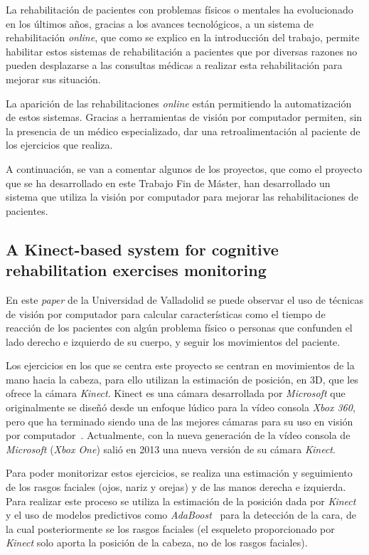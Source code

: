 
La rehabilitación de pacientes con problemas físicos o mentales ha evolucionado en los últimos años, gracias a los avances tecnológicos, a un sistema de rehabilitación \textit{online}, que como se explico en la introducción del trabajo, permite habilitar estos sistemas de rehabilitación a pacientes que por diversas razones no pueden desplazarse a las consultas médicas a realizar esta rehabilitación para mejorar sus situación.

La aparición de las rehabilitaciones \textit{online} están permitiendo la automatización de estos sistemas. Gracias a herramientas de visión por computador permiten, sin la presencia de un médico especializado, dar una retroalimentación al paciente de los ejercicios que realiza.

A continuación, se van a comentar algunos de los proyectos, que como el proyecto que se ha desarrollado en este Trabajo Fin de Máster, han desarrollado un sistema que utiliza la visión por computador para mejorar las rehabilitaciones de pacientes.

\subsection{A Kinect-based system for cognitive rehabilitation exercises monitoring~\cite{kinectbasedsystem}}
En este \textit{paper} de la Universidad de Valladolid se puede observar el uso de técnicas de visión por computador para calcular características como el tiempo de reacción de los pacientes con algún problema físico o personas que confunden el lado derecho e izquierdo de su cuerpo, y seguir los movimientos del paciente.

Los ejercicios en los que se centra este proyecto se centran en movimientos de la mano hacia la cabeza, para ello utilizan la estimación de posición, en 3D, que les ofrece la cámara \textit{Kinect}. Kinect es una cámara desarrollada por \textit{Microsoft} que originalmente se diseñó desde un enfoque lúdico para la vídeo consola \textit{Xbox 360}, pero que ha terminado siendo una de las mejores cámaras para su uso en visión por computador~\cite{wiki:kinect}. Actualmente, con la nueva generación de la vídeo consola de \textit{Microsoft} (\textit{Xbox One}) salió en 2013 una nueva versión de su cámara \textit{Kinect}.

Para poder monitorizar estos ejercicios, se realiza una estimación y seguimiento de los rasgos faciales (ojos, nariz y orejas) y de las manos derecha e izquierda. Para realizar este proceso se utiliza la estimación de la posición dada por \textit{Kinect} y el uso de modelos predictivos como \textit{AdaBoost}~\cite{ada} para la detección de la cara, de la cual posteriormente se los rasgos faciales (el esqueleto proporcionado por \textit{Kinect} solo aporta la posición de la cabeza, no de los rasgos faciales).

